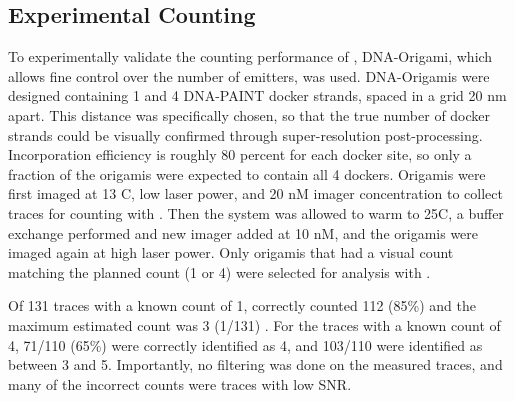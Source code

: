 \subsection{Experimental Counting}
To experimentally validate the counting performance of \ours, DNA-Origami, which allows fine control over the number of emitters, was used.
	DNA-Origamis were designed containing 1 and 4 DNA-PAINT docker strands, spaced in a grid 20 nm apart. 
	This distance was specifically chosen, so that the true number of docker strands could be visually confirmed through super-resolution post-processing.
	Incorporation efficiency is roughly 80 percent for each docker site, so only a fraction of the origamis were expected to contain all 4 dockers. 
	Origamis were first imaged at 13 C, low laser power, and 20 nM imager concentration to collect traces for counting with \ours {}.
	Then the system was allowed to warm to 25C, a buffer exchange performed and new imager added at 10 nM, and the origamis were imaged again at high laser power.
	Only origamis that had a visual count matching the planned count (1 or 4) were selected for analysis with \ours.

Of 131 traces with a known count of 1, \ours correctly counted 112 (85\%) and the maximum estimated count was 3 (1/131) \figref{}.
	For the traces with a known count of 4, 71/110 (65\%) were correctly identified as 4, and 103/110 were identified as between 3 and 5.
	Importantly, no filtering was done on the measured traces, and many of the incorrect counts were traces with low SNR. %
